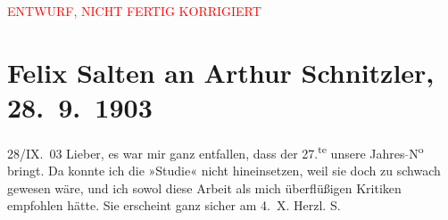 
\begin{center}
            \textcolor{red}{ENTWURF, NICHT FERTIG KORRIGIERT}
                      \end{center}
            
         \renewcommand{\erwaehnteOrte}{Orte: Wien}
         \renewcommand{\erwaehnteWerke}{Werke: Studie}
               \section[Felix Salten an Arthur Schnitzler, 28. 9. 1903]{ Felix Salten an Arthur Schnitzler, 28. 9. 1903}\nopagebreak{}\rehead{ }\begin{ledgroupsized}[t]{13cm}\normalsize\beginnumbering \toendnotes[C]{\smallbreak\pagebreak[2]} 
\pstart
           \raggedleft{}{\pb}28/IX. 03\pend
           \pstart
           Lieber, es war mir ganz entfallen, dass der 27.\textsuperscript{te} unsere Jahres\textcolor{gray}{-}N\textsuperscript{o} bringt. Da konnte ich die »Studie« nicht hineinsetzen, weil sie doch zu schwach gewesen
               wäre, und ich sowol diese Arbeit als mich
               überflüßigen Kritiken empfohlen hätte. Sie erscheint ganz sicher am
                  4. X.\pend
           \pstart Herzl. \spacefill\mbox{S.}\pend{}
         
         \endnumbering{}\end{ledgroupsized}\begin{anhang}\end{anhang}\newcommand{\dateiname}{L03345}\newcommand{\titel}{Felix Salten an Arthur Schnitzler, 28. 9. 1903}\newcommand{\editorInnen}{Martin Anton Müller und Laura Untner}
      